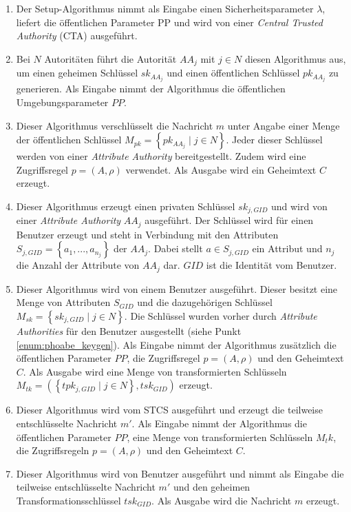 \newpage
\begin{enumerate}
	\item {} Der
		Setup-Algorithmus nimmt als Eingabe einen Sicherheitsparameter $\lambda$,
		liefert die öffentlichen Parameter $\text{PP}$ und wird von einer
		\textit{Central Trusted Authority} (CTA) ausgeführt.
	\item {} Bei $N$
		Autoritäten führt die Autorität $AA_j$ mit $j \in N$ diesen Algorithmus
		aus, um einen geheimen Schlüssel $sk_{AA_j}$ und einen öffentlichen
		Schlüssel $pk_{AA_j}$ zu generieren. Als Eingabe nimmt der Algorithmus die
		öffentlichen Umgebungsparameter $PP$.
	\item {} Dieser Algorithmus
		ver\-schlüs\-selt die Nachricht $m$ unter Angabe einer Menge der
		öffent\-lich\-en Schlüssel $M_{pk} = \left\{ pk_{AA_j} \;\vert\; j \in N
		\right\}$. Jeder dieser Schlüssel werden von einer \textit{Attribute
		Authority} bereitgestellt. Zudem wird eine Zugriffsregel $p = \left( A,
		\rho \right)$ verwendet. Als Ausgabe wird ein Geheimtext $C$ erzeugt.
	\item\label{enum:phoabe_keygen}  Dieser Algorithmus erzeugt einen privaten
		Schlüssel $sk_{j, GID}$ und wird von einer \textit{Attribute Authority}
		$AA_j$ ausgeführt. Der Schlüssel wird für einen Benutzer erzeugt und steht
		in Verbindung mit den Attributen $S_{j, GID} = \left\{ a_1, ..., a_{n_j}
		\right\}$ der $AA_j$.  Dabei stellt $a \in S_{j, GID}$ ein Attribut und
		$n_j$ die Anzahl der Attribute von $AA_j$ dar. $GID$ ist die Identität vom
		Benutzer.
	\item {} Dieser Algorithmus
		wird von einem Benutzer ausgeführt. Dieser besitzt eine Menge von
		Attributen $S_{GID}$ und die dazugehörigen Schlüssel $M_{sk} = \left\{
		sk_{j, GID} \;\vert\; j \in N \right\}$. Die Schlüssel wurden vorher durch
		\textit{Attribute Authorities} für den Benutzer ausgestellt (siehe Punkt
		\ref{enum:phoabe_keygen}). Als Eingabe nimmt der Algorithmus zusätzlich
		die öffentlichen Parameter $PP$, die Zugriffsregel $p = \left(A,
		\rho\right)$ und den Geheimtext $C$. Als Ausgabe wird eine Menge von
		transformierten Schlüsseln $M_{tk} = \left( \left\{tpk_{j, GID} \;\vert\;
		j \in N\right\}, tsk_{GID} \right)$ erzeugt.
	\item {} Dieser Algorithmus wird
		vom STCS ausgeführt und erzeugt die teilweise entschlüsselte Nachricht
		$m'$. Als Eingabe nimmt der Algorithmus die öffentlichen Parameter $PP$,
		eine Menge von transformierten Schlüsseln $M_tk$, die Zugriffsregeln $p =
		\left(A, \rho\right)$ und den Geheimtext $C$.
	\item {} Dieser Algorithmus wird von
		Benutzer ausgeführt und nimmt als Eingabe die teilweise entschlüsselte
		Nachricht $m'$ und den geheimen Transformationsschlüssel $tsk_{GID}$. Als
		Ausgabe wird die Nachricht $m$ erzeugt.
\end{enumerate}
